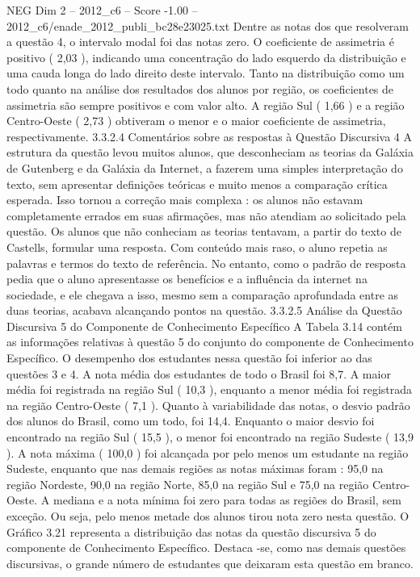 \begin{textsample}{NEG Dim 2 – 2012\_c6 – Score -1.00 – 2012\_c6/enade\_2012\_publi\_bc28e23025.txt}
Dentre as notas dos que resolveram a questão 4, o intervalo modal foi das notas zero.
O coeficiente de assimetria é positivo ( 2,03 ), indicando uma concentração do lado esquerdo da distribuição e uma cauda longa do lado direito deste intervalo.
Tanto na distribuição como um todo quanto na análise dos resultados dos alunos por região, os coeficientes de assimetria são sempre positivos e com valor alto.
A região Sul ( 1,66 ) e a região Centro-Oeste ( 2,73 ) obtiveram o menor e o maior coeficiente de assimetria, respectivamente. 3.3.2.4 Comentários sobre as respostas à Questão Discursiva 4 A estrutura da questão levou muitos alunos, que desconheciam as teorias da Galáxia de Gutenberg e da Galáxia da Internet, a fazerem uma simples interpretação do texto, sem apresentar definições teóricas e muito menos a comparação crítica esperada.
Isso tornou a correção mais complexa : os alunos não estavam completamente errados em suas afirmações, mas não atendiam ao solicitado pela questão.
Os alunos que não conheciam as teorias tentavam, a partir do texto de Castells, formular uma resposta.
Com conteúdo mais raso, o aluno repetia as palavras e termos do texto de referência.
No entanto, como o padrão de resposta pedia que o aluno apresentasse os benefícios e a influência da internet na sociedade, e ele chegava a isso, mesmo sem a comparação aprofundada entre as duas teorias, acabava alcançando pontos na questão. 3.3.2.5 Análise da Questão Discursiva 5 do Componente de Conhecimento Específico A Tabela 3.14 contém as informações relativas à questão 5 do conjunto do componente de Conhecimento Específico.
O desempenho dos estudantes nessa questão foi inferior ao das questões 3 e 4.
A nota média dos estudantes de todo o Brasil foi 8,7.
A maior média foi registrada na região Sul ( 10,3 ), enquanto a menor média foi registrada na região Centro-Oeste ( 7,1 ).
Quanto à variabilidade das notas, o desvio padrão dos alunos do Brasil, como um todo, foi 14,4.
Enquanto o maior desvio foi encontrado na região Sul ( 15,5 ), o menor foi encontrado na região Sudeste ( 13,9 ).
A nota máxima ( 100,0 ) foi alcançada por pelo menos um estudante na região Sudeste, enquanto que nas demais regiões as notas máximas foram : 95,0 na região Nordeste, 90,0 na região Norte, 85,0 na região Sul e 75,0 na região Centro-Oeste.
A mediana e a nota mínima foi zero para todas as regiões do Brasil, sem exceção.
Ou seja, pelo menos metade dos alunos tirou nota zero nesta questão.
O Gráfico 3.21 representa a distribuição das notas da questão discursiva 5 do componente de Conhecimento Específico.
Destaca -se, como nas demais questões discursivas, o grande número de estudantes que deixaram esta questão em branco.

\end{textsample}

